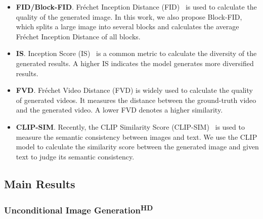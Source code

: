 \documentclass{article}
\begin{document}
\begin{itemize}[leftmargin=*]

\item \textbf{FID/Block-FID}. Fréchet Inception Distance (FID)~\cite{heuselGansTrainedTwo2017} is used to calculate the quality of the generated image. In this work, we also propose Block-FID, which splits a large image into several blocks and calculates the average Fréchet Inception Distance of all blocks. 


\item \textbf{IS}. Inception Score (IS)~\cite{salimansImprovedTechniquesTraining2016} is a common metric to calculate the diversity of the generated results. A higher IS indicates the model generates more diversified results.
\item \textbf{FVD}. Fréchet Video Distance (FVD) \cite{unterthinerAccurateGenerativeModels2018} is widely used to calculate the quality of generated videos. It measures the distance between the ground-truth video and the generated video. A lower FVD denotes a higher similarity.
\item \textbf{CLIP-SIM}. Recently, the CLIP Similarity Score (CLIP-SIM)~\cite{radfordLearningTransferableVisual2021} is used to measure the  semantic consistency between images and text. We use the CLIP model to calculate the similarity score between the generated image and given text to judge its semantic consistency.
\end{itemize}

\subsection{Main Results}
\subsubsection{Unconditional Image Generation\textsuperscript{\textbf{HD}}}
\vspace{-2mm}
\end{document}
